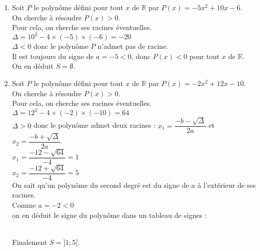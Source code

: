 \documentclass[a4paper,11pt,exos]{nsi} %
\begin{document}
\begin{enumerate}[itemsep=1em]
    \item Soit $P$ le polynôme défini pour tout $x$ de $\mathbb R$ par $P(x)=-5x^2+10x-6$.\\On cherche à résoudre $P(x)> 0$.\\Pour cela, on cherche ses racines éventuelles.\\$\Delta = 10^2-4\times(-5)\times(-6)=-20$\\$\Delta<0$ donc le polynôme $P$ n'admet pas de racine.\\ Il est toujours du signe de $a=-5<0$, donc $P(x)<0$ pour tout $x$ de $\mathbb{R}$.\\ On en déduit $S=\emptyset$.
    
    \item Soit $P$ le polynôme défini pour tout $x$ de $\mathbb R$ par $P(x)=-2x^2+12x-10$.\\On cherche à résoudre $P(x)>0$.\\Pour cela, on cherche ses racines éventuelles.\\$\Delta = 12^2-4\times(-2)\times(-10)=64$\\$\Delta>0$ donc le polynôme admet deux racines : $x_1 = \dfrac{-b-\sqrt{\Delta}}{2a}$ et $x_2 = \dfrac{-b+\sqrt{\Delta}}{2a}$.\\$x_1 =\dfrac{-12-\sqrt{64}}{-4}=1$\\$x_2 =\dfrac{-12+\sqrt{64}}{-4}=5$\\On sait qu'un polynôme du second degré est du signe de $a$ à l'extérieur de ses racines.\\Comme $a=-2<0$\\on en déduit le signe du polynôme dans un tableau de signes :\\
    \\[.5em] 
    Finalement $S=]1;5[$.
    

\end{enumerate}
\end{document}

